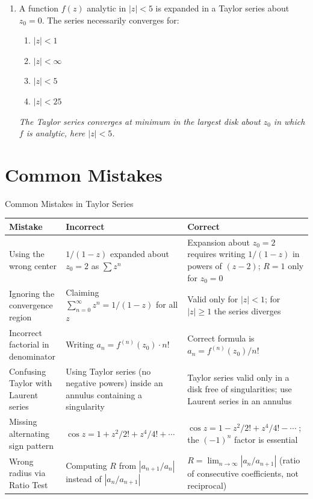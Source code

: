 \documentclass[12pt,a4paper]{article}
\begin{document}
\begin{enumerate}[label=\textbf{MCQ \arabic*.}, leftmargin=*, noitemsep]
\item A function $f(z)$ analytic in $|z|<5$ is expanded in a Taylor series about $z_0=0$. The series necessarily converges for:
\begin{enumerate}[label=(\alph*), noitemsep]
  \item $|z| < 1$
  \item $|z| < \infty$
  \item \textbf{$|z| < 5$}
  \item $|z| < 25$
\end{enumerate}
\textit{The Taylor series converges at minimum in the largest disk about $z_0$ in which $f$ is analytic, here $|z|<5$.}

\end{enumerate}

\section{Common Mistakes}

\begin{mistakebox}{Common Mistakes in Taylor Series}
\begin{tabular}{p{4.5cm} p{5.5cm} p{5.5cm}}
\toprule
\textbf{Mistake} & \textbf{Incorrect} & \textbf{Correct} \\
\midrule
Using the wrong center &
$1/(1-z)$ expanded about $z_0=2$ as $\sum z^n$ &
Expansion about $z_0=2$ requires writing $1/(1-z)$ in powers of $(z-2)$; $R=1$ only for $z_0=0$ \\
\midrule
Ignoring the convergence region &
Claiming $\sum_{n=0}^{\infty} z^n = 1/(1-z)$ for all $z$ &
Valid only for $|z|<1$; for $|z|\geq 1$ the series diverges \\
\midrule
Incorrect factorial in denominator &
Writing $a_n = f^{(n)}(z_0)\cdot n!$ &
Correct formula is $a_n = f^{(n)}(z_0)/n!$ \\
\midrule
Confusing Taylor with Laurent series &
Using Taylor series (no negative powers) inside an annulus containing a singularity &
Taylor series valid only in a disk free of singularities; use Laurent series in an annulus \\
\midrule
Missing alternating sign pattern &
$\cos z = 1 + z^2/2! + z^4/4! + \cdots$ &
$\cos z = 1 - z^2/2! + z^4/4! - \cdots\;$; the $(-1)^n$ factor is essential \\
\midrule
Wrong radius via Ratio Test &
Computing $R$ from $|a_{n+1}/a_n|$ instead of $|a_n/a_{n+1}|$ &
$R = \lim_{n\to\infty}|a_n/a_{n+1}|$ (ratio of consecutive coefficients, not reciprocal) \\
\bottomrule
\end{tabular}
\end{mistakebox}
\end{document}
